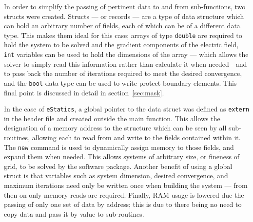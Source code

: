 		In order to simplify the passing of pertinent data to and from sub-functions, two structs were created. Structs --- or records --- are a type of data structure which can hold an arbitrary number of fields, each of which can be of a different data type. This makes them ideal for this case; arrays of type \lstinline|double| are required to hold the system to be solved and the gradient components of the electric field, \lstinline|int| variables can be used to hold the dimensions of the array --- which allows the solver to simply read this information rather than calculate it when needed - and to pass back the number of iterations required to meet the desired convergence, and the \lstinline|bool| data type can be used to write-protect boundary elements. This final point is discussed in detail in section~\ref{sec:mask}.
		
		In the case of \lstinline|eStatics|, a global pointer to the data struct was defined as \lstinline|extern| in the header file and created outside the main function. This allows the designation of a memory address to the structure which can be seen by all sub-routines, allowing each to read from and write to the fields contained within it. The \lstinline|new| command is used to dynamically assign memory to those fields, and expand them when needed. This allows systems of arbitrary size, or fineness of grid, to be solved by the software package. Another benefit of using a global struct is that variables such as system dimension, desired convergence, and maximum iterations need only be written once when building the system --- from then on only memory reads are required. Finally, RAM usage is lowered due the passing of only one set of data by address; this is due to there being no need to copy data and pass it by value to sub-routines.